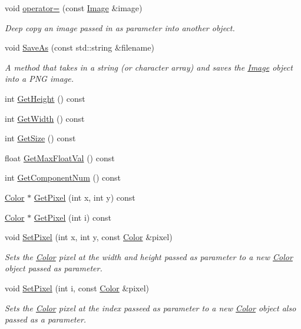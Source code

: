 \begin{DoxyCompactItemize}
void \hyperlink{classImage_ae6b1cdd82584ce9fb729c1e062ee088b}{operator=} (const \hyperlink{classImage}{Image} \&image)
\begin{DoxyCompactList}\small\item\em Deep copy an image passed in as parameter into another object. \end{DoxyCompactList}\item 
void \hyperlink{classImage_afd027f3a969d6ff41c76a4ab2599d85d}{Save\+As} (const std\+::string \&filename)
\begin{DoxyCompactList}\small\item\em A method that takes in a string (or character array) and saves the \hyperlink{classImage}{Image} object into a P\+NG image. \end{DoxyCompactList}\item 
int \hyperlink{classImage_a631ead4be012caf49b3209d2ac401214}{Get\+Height} () const
\item 
int \hyperlink{classImage_a3da5012d5e314ce03b53d77276232186}{Get\+Width} () const
\item 
int \hyperlink{classImage_a8ee1acb5476bf0fecac66f5dfdd47a38}{Get\+Size} () const
\item 
float \hyperlink{classImage_a9efc74ed4a9af25d1eb01416ec47e78e}{Get\+Max\+Float\+Val} () const
\item 
int \hyperlink{classImage_aec11158c35b24ba60a835c877d791b36}{Get\+Component\+Num} () const
\item 
\hyperlink{classColor}{Color} $\ast$ \hyperlink{classImage_a01fc9742fb7bb83f66027d5c9091d477}{Get\+Pixel} (int x, int y) const
\item 
\hyperlink{classColor}{Color} $\ast$ \hyperlink{classImage_a1d2472f49fc5cd5458f32fc54affddcf}{Get\+Pixel} (int i) const
\item 
void \hyperlink{classImage_a4b464d4f6348e8be2480688d9871ceac}{Set\+Pixel} (int x, int y, const \hyperlink{classColor}{Color} \&pixel)
\begin{DoxyCompactList}\small\item\em Sets the \hyperlink{classColor}{Color} pixel at the width and height passed as parameter to a new \hyperlink{classColor}{Color} object passed as parameter. \end{DoxyCompactList}\item 
void \hyperlink{classImage_a9774c194cd627ccb7dfe4165e7e5e996}{Set\+Pixel} (int i, const \hyperlink{classColor}{Color} \&pixel)
\begin{DoxyCompactList}\small\item\em Sets the \hyperlink{classColor}{Color} pixel at the index passeed as parameter to a new \hyperlink{classColor}{Color} object also passed as a parameter. \end{DoxyCompactList}\item 

\end{DoxyCompactItemize}
